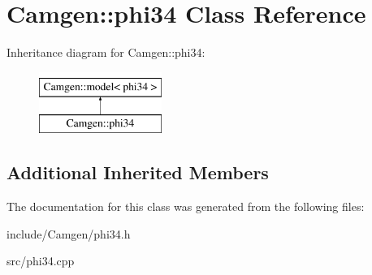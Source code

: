 \hypertarget{a00425}{}\section{Camgen\+:\+:phi34 Class Reference}
\label{a00425}
Inheritance diagram for Camgen\+:\+:phi34\+:\begin{figure}[H]
\begin{center}
\leavevmode
\includegraphics[height=2.000000cm]{a00425}
\end{center}
\end{figure}
\subsection*{Additional Inherited Members}


The documentation for this class was generated from the following files\+:\begin{DoxyCompactItemize}
\item 
include/\+Camgen/phi34.\+h\item 
src/phi34.\+cpp\end{DoxyCompactItemize}
